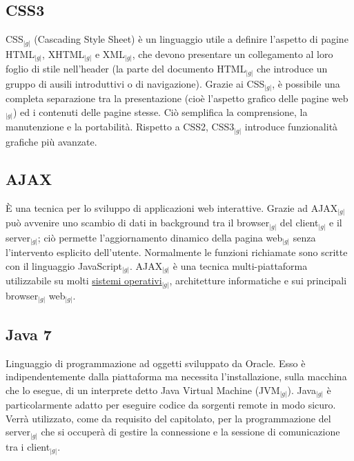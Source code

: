 {	\subsection{CSS3}{
		CSS$_{|g|}$ (Cascading Style Sheet) è un linguaggio utile a definire l’aspetto di pagine HTML$_{|g|}$, 
		XHTML$_{|g|}$ e XML$_{|g|}$, che devono presentare un collegamento al loro foglio di stile nell’header 
		(la parte del documento HTML$_{|g|}$ che introduce un gruppo di ausili introduttivi o di navigazione). 
		Grazie ai CSS$_{|g|}$, è possibile una completa separazione tra la presentazione (cioè l’aspetto grafico 
		delle pagine web$_{|g|}$) ed i contenuti delle pagine stesse. Ciò semplifica la comprensione, la manutenzione 
		e la portabilità. Rispetto a CSS2, CSS3$_{|g|}$ introduce funzionalità grafiche più avanzate.
	}

	\subsection{AJAX}{ 
		\`E una tecnica per lo sviluppo di applicazioni web interattive. Grazie ad AJAX$_{|g|}$ può avvenire uno 
		scambio di dati in background tra il browser$_{|g|}$ del client$_{|g|}$ e il server$_{|g|}$; ciò permette 
		l’aggiornamento dinamico della pagina web$_{|g|}$ senza l’intervento esplicito dell’utente.
		Normalmente le funzioni richiamate sono scritte con il linguaggio JavaScript$_{|g|}$.
		AJAX$_{|g|}$ è una tecnica multi-piattaforma utilizzabile su molti \underline{sistemi operativi}$_{|g|}$, 
		architetture informatiche e sui principali browser$_{|g|}$ web$_{|g|}$.
	}

	\subsection{Java 7}{
		Linguaggio di programmazione ad oggetti sviluppato da Oracle. Esso è indipendentemente dalla piattaforma 
		ma necessita l’installazione, sulla macchina che lo esegue, di un interprete detto Java Virtual Machine 
		(JVM$_{|g|}$). Java$_{|g|}$ è particolarmente adatto per eseguire codice da sorgenti remote in modo sicuro. 
		Verrà utilizzato, come da requisito del capitolato, per la programmazione del server$_{|g|}$ che si occuperà 
		di gestire la connessione e la sessione di comunicazione tra i client$_{|g|}$.
	}

}
